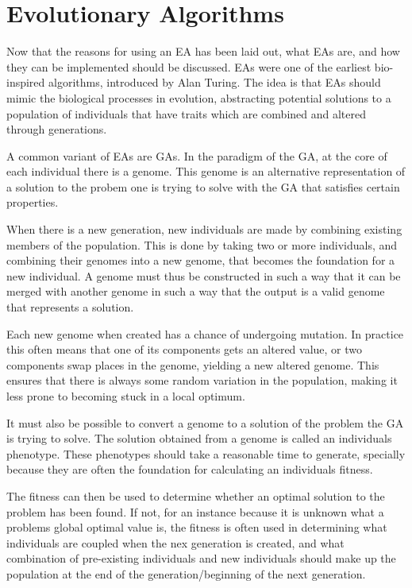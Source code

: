 

\section{Evolutionary Algorithms} %
\label{sec:evolutionary_algorithms}
Now that the reasons for using an EA has been laid out, what EAs are, and how they can be implemented should be discussed. EAs were one of the earliest bio-inspired algorithms, introduced by Alan Turing. The idea is that EAs should mimic the biological processes in evolution, abstracting potential solutions to a population of individuals that have traits which are combined and altered through generations.

A common variant of EAs are GAs. In the paradigm of the GA, at the core of each individual there is a genome. This genome is an alternative representation of a solution to the probem one is trying to solve with the GA that satisfies certain properties.

When there is a new generation, new individuals are made by combining existing members of the population. This is done by taking two or more individuals, and combining their genomes into a new genome, that becomes the foundation for a new individual. A genome must thus be constructed in such a way that it can be merged with another genome in such a way that the output is a valid genome that represents a solution.

Each new genome when created has a chance of undergoing mutation. In practice this often means that one of its components gets an altered value, or two components swap places in the genome, yielding a new altered genome. This ensures that there is always some random variation in the population, making it less prone to becoming stuck in a local optimum.

It must also be possible to convert a genome to a solution of the problem the GA is trying to solve. The solution obtained from a genome is called an individuals phenotype. These phenotypes should take a reasonable time to generate, specially because they are often the foundation for calculating an individuals fitness.

The fitness can then be used to determine whether an optimal solution to the problem has been found. If not, for an instance because it is unknown what a problems global optimal value is, the fitness is often used in determining what individuals are coupled when the nex generation is created, and what combination of pre-existing individuals and new individuals should make up the population at the end of the generation/beginning of the next generation.

